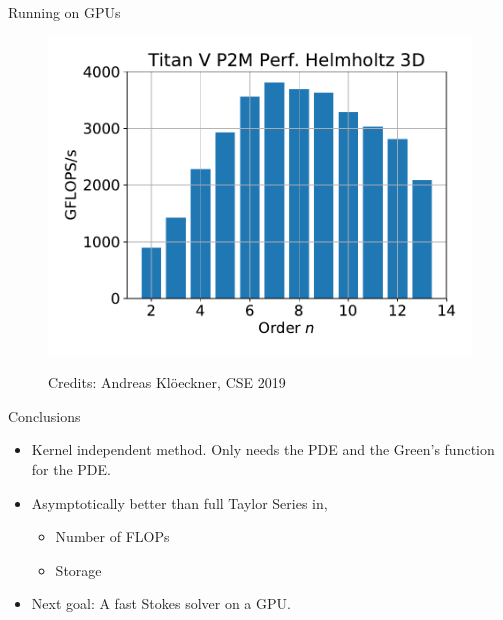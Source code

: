 \documentclass[10pt]{beamer}
\begin{document}
\begin{frame}[fragile]{Running on GPUs}
\begin{figure}
\includegraphics[scale=0.28]{figures/perf-helmholtz-3d.pdf}

Credits: Andreas Kl{\"o}eckner, CSE 2019
\end{figure}
\end{frame}

\begin{frame}[fragile]{Conclusions}
\begin{itemize}
 \item Kernel independent method. Only needs the PDE and the Green's function for the PDE.
 \item Asymptotically better than full Taylor Series in,
    \begin{itemize}
     \item Number of FLOPs
     \item Storage
    \end{itemize}
  \item Next goal: A fast Stokes solver on a GPU.
\end{itemize}

\end{frame}
\end{document}
